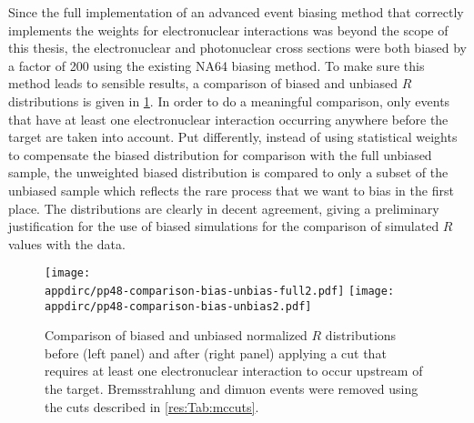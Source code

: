 Since the full implementation of an advanced event biasing method that correctly implements the weights for electronuclear interactions was beyond the scope of this thesis, the electronuclear and photonuclear cross sections were both biased by a factor of 200 using the existing NA64 biasing method. To make sure this method leads to sensible results, a comparison of biased and unbiased $R$ distributions is given in \ref{res:fig:biascomp}. In order to do a meaningful comparison, only events that have at least one electronuclear interaction occurring anywhere before the target are taken into account. Put differently, instead of using statistical weights to compensate the biased distribution for comparison with the full unbiased sample, the unweighted biased distribution is compared to only a subset of the unbiased sample which reflects the rare process that we want to bias in the first place. The distributions are clearly in decent agreement, giving a preliminary justification for the use of biased simulations for the comparison of simulated $R$ values with the data.
%
\begin{figure}[htb]
    \centering
    \texttt{[image: \\appdirc/pp48-comparison-bias-unbias-full2.pdf]}
    \texttt{[image: \\appdirc/pp48-comparison-bias-unbias2.pdf]}
    \caption[Comparison of biased and unbiased $R$ distributions.]{Comparison of biased and unbiased normalized $R$ distributions before (left panel) and after (right panel) applying a cut that requires at least one electronuclear interaction to occur upstream of the target. Bremsstrahlung and dimuon events were removed using the cuts described in \ref{res:Tab:mccuts}.}
  \label{res:fig:biascomp}
\end{figure}

